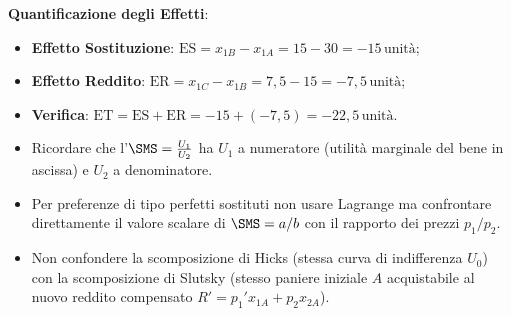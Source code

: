 \begin{esercizio}
\begin{enumerate}
    \textbf{Quantificazione degli Effetti}:
    \begin{itemize}
        \item \textbf{Effetto Sostituzione}: $\text{ES} = x_{1B} - x_{1A} = 15 - 30 = -15\,\text{unità}$;
        \item \textbf{Effetto Reddito}: $\text{ER} = x_{1C} - x_{1B} = 7{,}5 - 15 = -7{,}5\,\text{unità}$;
        \item \textbf{Verifica}: $\text{ET} = \text{ES} + \text{ER} = -15 + (-7{,}5) = -22{,}5\,\text{unità}$.
    \end{itemize}
\end{enumerate}
\end{esercizio}

\begin{esame}
\begin{itemize}
    \item Ricordare che l'$\SMS = \frac{U_1}{U_2}$ ha $U_1$ a numeratore (utilità marginale del bene in ascissa) e $U_2$ a denominatore.
    \item Per preferenze di tipo perfetti sostituti non usare Lagrange ma confrontare direttamente il valore scalare di $\SMS = a/b$ con il rapporto dei prezzi $p_1/p_2$.
    \item Non confondere la scomposizione di Hicks (stessa curva di indifferenza $U_0$) con la scomposizione di Slutsky (stesso paniere iniziale $A$ acquistabile al nuovo reddito compensato $R' = p_1' x_{1A} + p_2 x_{2A}$).
\end{itemize}
\end{esame}
